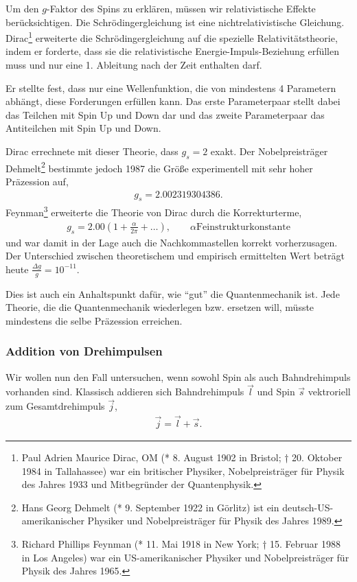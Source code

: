 Um den $g$-Faktor des Spins zu erklären, müssen wir relativistische Effekte
berücksichtigen. Die Schrödingergleichung ist eine nichtrelativistische
Gleichung. Dirac\footnote{Paul Adrien Maurice Dirac, OM (* 8. August 1902 in
Bristol; † 20. Oktober 1984 in Tallahassee) war ein britischer Physiker,
Nobelpreisträger für Physik des Jahres 1933 und Mitbegründer der
Quantenphysik.} erweiterte die Schrödingergleichung auf die spezielle
Relativitätstheorie, indem er forderte, dass sie die relativistische
Energie-Impuls-Beziehung erfüllen muss und nur eine 1. Ableitung nach der Zeit
enthalten darf.

Er stellte fest, dass nur eine Wellenfunktion, die von mindestens 4 Parametern
abhängt, diese Forderungen erfüllen kann. Das erste Parameterpaar stellt dabei
das Teilchen mit Spin Up und Down dar und das zweite Parameterpaar das
Antiteilchen mit Spin Up und Down.

Dirac errechnete mit dieser Theorie, dass $g_s=2$ exakt. Der Nobelpreisträger
Dehmelt\footnote{Hans Georg Dehmelt (* 9. September 1922 in Görlitz) ist ein
deutsch-US-amerikanischer Physiker und Nobelpreisträger für Physik des Jahres
1989.} bestimmte jedoch 1987 die Größe experimentell mit sehr hoher Präzession auf,
\begin{align*}
g_s = 2.002319304386.
\end{align*}
Feynman\footnote{Richard Phillips Feynman (* 11. Mai 1918 in New
York; † 15. Februar 1988 in Los Angeles) war ein US-amerikanischer Physiker
und Nobelpreisträger für Physik des Jahres 1965.} erweiterte die Theorie von
Dirac durch die Korrekturterme,
\begin{align*}
g_s = 2.00 \left(1 + \frac{\alpha}{2\pi} + \ldots \right),\qquad \alpha \text{
Feinstrukturkonstante}
\end{align*}
und war damit in der Lage auch die Nachkommastellen korrekt vorherzusagen. Der
Unterschied zwischen theoretischem und empirisch ermittelten Wert beträgt
heute $\frac{\Delta g}{g} = 10^{-11}$.

Dies ist auch ein Anhaltspunkt dafür, wie ``gut'' die Quantenmechanik ist. Jede
Theorie, die die Quantenmechanik wiederlegen bzw. ersetzen will, müsste
mindestens die selbe Präzession erreichen.

\subsubsection{Addition von Drehimpulsen}

Wir wollen nun den Fall untersuchen, wenn sowohl Spin als auch
Bahndrehimpuls vorhanden sind. Klassisch addieren sich Bahndrehimpuls $\vec{l}$
und Spin $\vec{s}$ vektroriell zum Gesamtdrehimpuls $\vec{j}$,
\begin{align*}
\vec{j} = \vec{l} + \vec{s}.
\end{align*}

